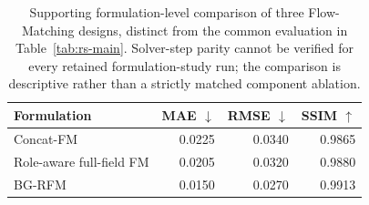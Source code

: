 \begin{table}[t]
\centering
\caption{Supporting formulation-level comparison of three Flow-Matching designs, distinct from the common evaluation in Table~\ref{tab:rs-main}. Solver-step parity cannot be verified for every retained formulation-study run; the comparison is descriptive rather than a strictly matched component ablation.}
\label{tab:design-ablation}
\begin{tabular}{lrrr}
\toprule
Formulation & MAE $\downarrow$ & RMSE $\downarrow$ & SSIM $\uparrow$ \\
\midrule
Concat-FM & 0.0225 & 0.0340 & 0.9865 \\
Role-aware full-field FM & 0.0205 & 0.0320 & 0.9880 \\
BG-RFM & 0.0150 & 0.0270 & 0.9913 \\
\bottomrule
\end{tabular}
\end{table}
